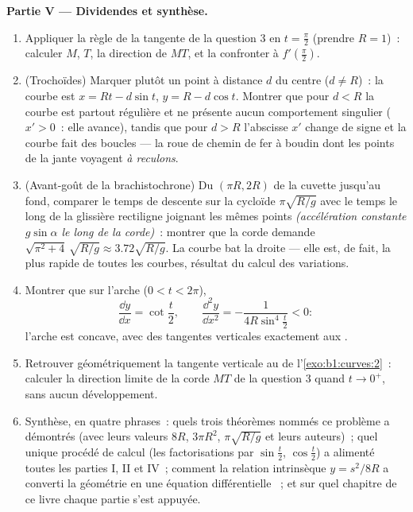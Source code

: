 \begin{problem}
\medskip
\noindent\textbf{Partie V --- Dividendes et synthèse.}
\begin{enumerate}[resume]
  \item Appliquer la règle de la tangente de la question 3 en $t =
        \frac\pi2$ (prendre $R = 1$)~: calculer $M$, $T$, la
        direction de $MT$, et la confronter à
        $f'(\frac\pi2)$.
  \item (Trochoïdes) Marquer plutôt un point à distance $d$ du
        centre ($d \neq R$)~: la courbe est $x = Rt -
        d\sin t$, $y = R - d\cos t$. Montrer que pour $d < R$ la
        courbe est partout régulière et ne présente aucun
        comportement singulier ($x' > 0$~: elle avance), tandis que pour $d
        > R$ l'abscisse $x'$ change de signe et la courbe fait
        des boucles --- la roue de chemin de fer à boudin dont les points de
        la jante voyagent \emph{à reculons}.
  \item (Avant-goût de la brachistochrone) Du  $(\pi R, 2R)$ de
        la cuvette jusqu'au fond, comparer le temps de descente sur la cycloïde
        $\pi\sqrt{R/g}$ avec le temps le long de la glissière rectiligne
        joignant les mêmes points \emph{(accélération constante
        $g\sin\alpha$ le long de la corde)}~: montrer que la corde demande
        $\sqrt{\pi^2 + 4}\,\sqrt{R/g} \approx 3.72\sqrt{R/g}$.
        La courbe bat la droite --- elle est, de fait, la plus rapide
        de toutes les courbes, résultat du calcul des variations.
  \item Montrer que sur l'arche ($0 < t < 2\pi$),
        \[
        \frac{\dd y}{\dd x} = \cot\frac t2,
        \qquad
        \frac{\dd^2 y}{\dd x^2} =
        -\frac{1}{4R\sin^4\frac t2} < 0 :
        \]
        l'arche est concave, avec des tangentes verticales exactement aux
        .
  \item Retrouver géométriquement la tangente verticale au  de
        l'\cref{exo:b1:curves:2}~: calculer la direction limite
        de la corde $MT$ de la question 3 quand $t \to
        0^{+}$, sans aucun développement.
  \item Synthèse, en quatre phrases~: quels trois théorèmes nommés
        ce problème a démontrés (avec leurs valeurs $8R$, $3\pi
        R^2$, $\pi\sqrt{R/g}$ et leurs auteurs)~; quel unique
        procédé de calcul (les factorisations par $\sin\frac t2$, $\cos\frac t2$)
        a alimenté toutes les parties I, II et IV~; comment
        la relation intrinsèque $y = s^2/8R$ a converti la géométrie
        en une équation différentielle ~; et sur quel chapitre
        de ce livre chaque partie s'est appuyée.
\end{enumerate}
\end{problem}
